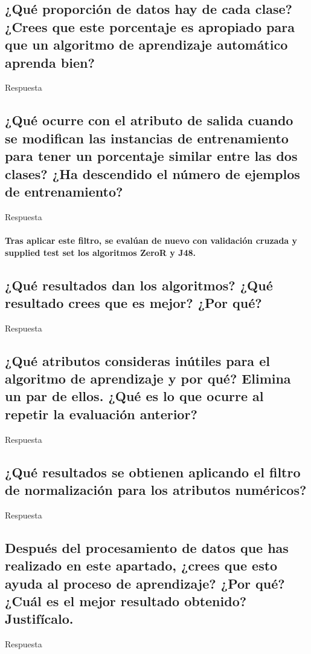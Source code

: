 \documentclass[12pt]{article}
\begin{document}
\subsection{\small ¿Qué proporción de datos hay de cada clase? ¿Crees que este
porcentaje es apropiado para que un algoritmo de aprendizaje automático aprenda
bien?}

Respuesta

\subsection{\small ¿Qué ocurre con el atributo de salida cuando se modifican
las instancias de entrenamiento para tener un porcentaje similar entre las dos
clases? ¿Ha descendido el número de ejemplos de entrenamiento?}

Respuesta

\paragraph{\small Tras aplicar este filtro, se evalúan de nuevo con validación
cruzada y supplied test set los algoritmos ZeroR y J48.}

\subsection{\small ¿Qué resultados dan los algoritmos? ¿Qué resultado crees que
es mejor? ¿Por qué?}

Respuesta

\subsection{\small ¿Qué atributos consideras inútiles para el algoritmo de
aprendizaje y por qué? Elimina un par de ellos. ¿Qué es lo que ocurre al
repetir la evaluación anterior?}

Respuesta

\subsection{\small ¿Qué resultados se obtienen aplicando el filtro de
normalización para los atributos numéricos?}

Respuesta

\subsection{\small Después del procesamiento de datos que has realizado en este
apartado, ¿crees que esto ayuda al proceso de aprendizaje? ¿Por qué? ¿Cuál es
el mejor resultado obtenido? Justifícalo.}

Respuesta
\end{document}
